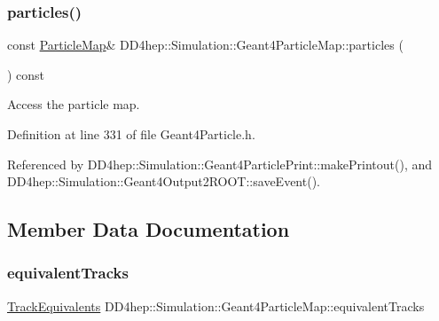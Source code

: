 \hypertarget{class_d_d4hep_1_1_simulation_1_1_geant4_particle_map_a6e8245c2158d512a24687c458305a251}{}\label{class_d_d4hep_1_1_simulation_1_1_geant4_particle_map_a6e8245c2158d512a24687c458305a251} 
\subsubsection{\texorpdfstring{particles()}{particles()}}
{\footnotesize\ttfamily const \hyperlink{class_d_d4hep_1_1_simulation_1_1_geant4_particle_map_a065c5fb0629285022b9aa2a628bffef3}{Particle\+Map}\& D\+D4hep\+::\+Simulation\+::\+Geant4\+Particle\+Map\+::particles (\begin{DoxyParamCaption}{ }\end{DoxyParamCaption}) const\hspace{0.3cm}{\ttfamily [inline]}}



Access the particle map. 



Definition at line 331 of file Geant4\+Particle.\+h.



Referenced by D\+D4hep\+::\+Simulation\+::\+Geant4\+Particle\+Print\+::make\+Printout(), and D\+D4hep\+::\+Simulation\+::\+Geant4\+Output2\+R\+O\+O\+T\+::save\+Event().



\subsection{Member Data Documentation}
\hypertarget{class_d_d4hep_1_1_simulation_1_1_geant4_particle_map_a61cdcde928de729988141a9cf643e9ad}{}\label{class_d_d4hep_1_1_simulation_1_1_geant4_particle_map_a61cdcde928de729988141a9cf643e9ad} 
\subsubsection{\texorpdfstring{equivalent\+Tracks}{equivalentTracks}}
{\footnotesize\ttfamily \hyperlink{class_d_d4hep_1_1_simulation_1_1_geant4_particle_map_aba09f5fcb2dd5874d129660ad4454a21}{Track\+Equivalents} D\+D4hep\+::\+Simulation\+::\+Geant4\+Particle\+Map\+::equivalent\+Tracks}



